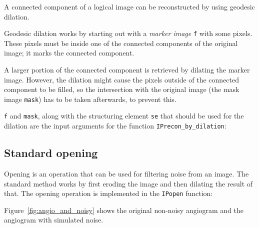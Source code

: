 A connected component of a logical image can be reconstructed by using geodesic dilation.

Geodesic dilation works by starting out with a \emph{marker image} \texttt{f} with some pixels.
These pixels must be inside one of the connected components of the original image; it marks the connected component.

A larger portion of the connected component is retrieved by dilating the marker image.
However, the dilation might cause the pixels outside of the connected component to be filled, so the intersection with the original image (the mask image \texttt{mask}) has to be taken afterwards, to prevent this.

\texttt{f} and \texttt{mask}, along with the structuring element \texttt{se} that should be used for the dilation are the input arguments for the function \texttt{IPrecon\_by\_dilation}:

\subsection*{Standard opening}
Opening is an operation that can be used for filtering noise from an image.
The standard method works by first eroding the image and then dilating the result of that.
The opening operation is implemented in the \texttt{IPopen} function:

Figure~\ref{fig:angio_and_noisy} shows the original non-noisy angiogram and the angiogram with simulated noise.

